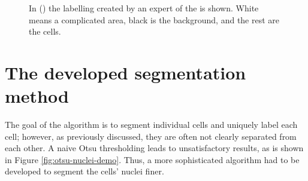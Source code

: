 \documentclass[
  digital,     %
  oneside,     %
  nosansbold,  %
  nocolorbold, %
  lof,         %
  lot,         %
]{fithesis4}
\begin{document}
\begin{figure}
\begin{subfigure}[t]{0.4\textwidth}
        \caption{}
        \label{fig:label_ground_truth}
    \end{subfigure}
    \caption{In () the labelling created by an expert of the  is shown. White means a complicated area, black is the background, and the rest are the cells.}
\end{figure}

\clearpage

\chapter{The developed segmentation method}
The goal of the algorithm is to segment individual cells and uniquely label each
cell; however, as previously discussed, they are often not clearly separated
from each other. A naive Otsu thresholding leads to unsatisfactory results, as is
shown in Figure \ref{fig:otsu-nuclei-demo}. Thus, a more sophisticated algorithm
had to be developed to segment the cells' nuclei finer.
\end{document}
